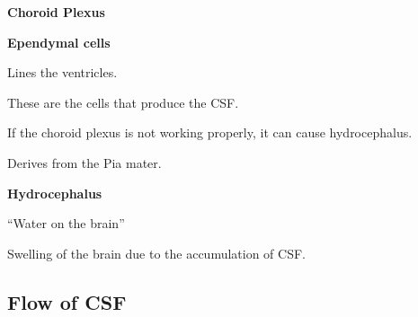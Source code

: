 \begin{coloredlist}
    \item \textbf{Choroid Plexus}
    \begin{coloredlist}
        \item \textbf{Ependymal cells}
        \begin{coloredlist}
            \item Lines the ventricles.
            \item These are the cells that produce the CSF.
        \end{coloredlist}
        \item If the choroid plexus is not working properly, it can cause hydrocephalus.
        \item Derives from the Pia mater.
        \item \textbf{Hydrocephalus}
        \begin{coloredlist}
            \item ``Water on the brain''
            \item Swelling of the brain due to the accumulation of CSF.
        \end{coloredlist}

    \end{coloredlist}
\end{coloredlist}

\subsection{Flow of CSF}

